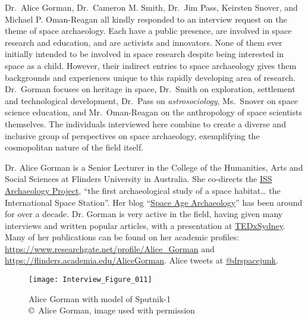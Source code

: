 Dr.~Alice Gorman, Dr.~Cameron M. Smith, Dr.~Jim Pass, Keirsten Snover, and Michael P. Oman-Reagan all kindly responded to an interview request on the theme of space archaeology. Each have a public presence, are involved in space research and education, and are activists and innovators. None of them ever initially intended to be involved in space research despite being interested in space as a child. However, their indirect entries to space archaeology gives them backgrounds and experiences unique to this rapidly developing area of research. Dr.~Gorman focuses on heritage in space, Dr.~Smith on exploration, settlement and technological development, Dr.~Pass on \emph{astrosociology}, Ms.~Snover on space science education, and Mr.~Oman-Reagan on the anthropology of space scientists themselves. The individuals interviewed here combine to create a diverse and inclusive group of perspectives on space archaeology, exemplifying the cosmopolitan nature of the field itself.


Dr. Alice Gorman is a Senior Lecturer in the College of the Humanities, Arts and Social Sciences at Flinders University in Australia.
She co-directs the \href{https://issarchaeology.org}{ISS Archaeology Project}, “the first archaeological study of a space habitat… the International Space Station”.
Her blog “\href{https://zoharesque.blogspot.ca}{Space Age Archaeology}” has been around for over a decade. Dr. Gorman is very active in the field, having given many interviews and written popular articles, with a presentation at
\href{https://www.youtube.com/watch?v=x5fn-iycWBs}{TEDxSydney}.
Many of her publications can be found on her academic profiles: \href{https://www.researchgate.net/profile/Alice_Gorman}{https://www.researchgate.net/profile/Alice\_Gorman} and \href{https://flinders.academia.edu/AliceGorman}{https://flinders.academia.edu/AliceGorman}. Alice tweets at \href{<twitter.com/drspacejunk>}{@drspacejunk}.

\begin{figure}[!htb]
	\texttt{[image: Interview\_Figure\_011]}
	\centering
	\caption{Alice Gorman with model of Sputnik-1
		{\normalfont\scriptsize \\ \copyright\ Alice Gorman, image used with permission
	}}
	\label{Interview_Figure_011}
\end{figure}

